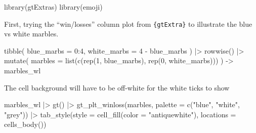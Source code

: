 \documentclass[
  letterpaper,
  DIV=11,
  numbers=noendperiod]{scrartcl}
\newenvironment{Shaded}{\begin{snugshade}}{\end{snugshade}}
\newcommand{\AttributeTok}[1]{\textcolor[rgb]{0.40,0.45,0.13}{#1}}
\newcommand{\DecValTok}[1]{\textcolor[rgb]{0.68,0.00,0.00}{#1}}
\newcommand{\FunctionTok}[1]{\textcolor[rgb]{0.28,0.35,0.67}{#1}}
\newcommand{\NormalTok}[1]{\textcolor[rgb]{0.00,0.23,0.31}{#1}}
\newcommand{\OtherTok}[1]{\textcolor[rgb]{0.00,0.23,0.31}{#1}}
\newcommand{\SpecialCharTok}[1]{\textcolor[rgb]{0.37,0.37,0.37}{#1}}
\newcommand{\StringTok}[1]{\textcolor[rgb]{0.13,0.47,0.30}{#1}}
\begin{document}
\begin{Shaded}
\begin{Highlighting}[]
\FunctionTok{library}\NormalTok{(gtExtras)}
\FunctionTok{library}\NormalTok{(emoji)}
\end{Highlighting}
\end{Shaded}

First, trying the ``win/losses'' column plot from \texttt{\{gtExtra\}}
to illustrate the blue vs white marbles.

\begin{Shaded}
\begin{Highlighting}[]
\FunctionTok{tibble}\NormalTok{(}
  \AttributeTok{blue\_marbs =} \DecValTok{0}\SpecialCharTok{:}\DecValTok{4}\NormalTok{,}
  \AttributeTok{white\_marbs =} \DecValTok{4} \SpecialCharTok{{-}}\NormalTok{ blue\_marbs}
\NormalTok{) }\SpecialCharTok{|\textgreater{}} 
  \FunctionTok{rowwise}\NormalTok{() }\SpecialCharTok{|\textgreater{}} 
  \FunctionTok{mutate}\NormalTok{(}
    \AttributeTok{marbles =} \FunctionTok{list}\NormalTok{(}\FunctionTok{c}\NormalTok{(}\FunctionTok{rep}\NormalTok{(}\DecValTok{1}\NormalTok{, blue\_marbs), }
                     \FunctionTok{rep}\NormalTok{(}\DecValTok{0}\NormalTok{, white\_marbs)))}
\NormalTok{  ) }\OtherTok{{-}\textgreater{}} 
\NormalTok{  marbles\_wl}
\end{Highlighting}
\end{Shaded}

The cell background will have to be off-white for the white ticks to
show

\begin{Shaded}
\begin{Highlighting}[]
\NormalTok{marbles\_wl }\SpecialCharTok{|\textgreater{}} 
  \FunctionTok{gt}\NormalTok{() }\SpecialCharTok{|\textgreater{}} 
  \FunctionTok{gt\_plt\_winloss}\NormalTok{(marbles, }\AttributeTok{palette =} \FunctionTok{c}\NormalTok{(}\StringTok{"blue"}\NormalTok{, }\StringTok{"white"}\NormalTok{, }\StringTok{"grey"}\NormalTok{)) }\SpecialCharTok{|\textgreater{}} 
  \FunctionTok{tab\_style}\NormalTok{(}\AttributeTok{style =} \FunctionTok{cell\_fill}\NormalTok{(}\AttributeTok{color =} \StringTok{"antiquewhite"}\NormalTok{), }
            \AttributeTok{locations =} \FunctionTok{cells\_body}\NormalTok{())}
\end{Highlighting}
\end{Shaded}
\end{document}
